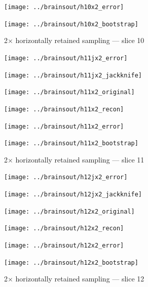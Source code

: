\documentclass[article]{jdssv}
\begin{document}
\begin{appendix}
\begin{figure}
\begin{centering}
\parbox{\imsize}{\texttt{[image: ../brainsout/h10x2\_error]}}
\parbox{\imsize}{\texttt{[image: ../brainsout/h10x2\_bootstrap]}}

\end{centering}
\caption{2$\times$ horizontally retained sampling --- slice 10}
\end{figure}


\begin{figure}
\begin{centering}

\parbox{\imsize}{\texttt{[image: ../brainsout/h11jx2\_error]}}
\parbox{\imsize}{\texttt{[image: ../brainsout/h11jx2\_jackknife]}}

\vspace{\vertsep}

\parbox{\imsize}{\texttt{[image: ../brainsout/h11x2\_original]}}
\parbox{\imsize}{\texttt{[image: ../brainsout/h11x2\_recon]}}

\vspace{\vertsep}

\parbox{\imsize}{\texttt{[image: ../brainsout/h11x2\_error]}}
\parbox{\imsize}{\texttt{[image: ../brainsout/h11x2\_bootstrap]}}

\end{centering}
\caption{2$\times$ horizontally retained sampling --- slice 11}
\end{figure}


\begin{figure}
\begin{centering}

\parbox{\imsize}{\texttt{[image: ../brainsout/h12jx2\_error]}}
\parbox{\imsize}{\texttt{[image: ../brainsout/h12jx2\_jackknife]}}

\vspace{\vertsep}

\parbox{\imsize}{\texttt{[image: ../brainsout/h12x2\_original]}}
\parbox{\imsize}{\texttt{[image: ../brainsout/h12x2\_recon]}}

\vspace{\vertsep}

\parbox{\imsize}{\texttt{[image: ../brainsout/h12x2\_error]}}
\parbox{\imsize}{\texttt{[image: ../brainsout/h12x2\_bootstrap]}}

\end{centering}
\caption{2$\times$ horizontally retained sampling --- slice 12}
\end{figure}


\begin{figure}
\begin{centering}


\end{centering}
\end{figure}
\end{appendix}
\end{document}
